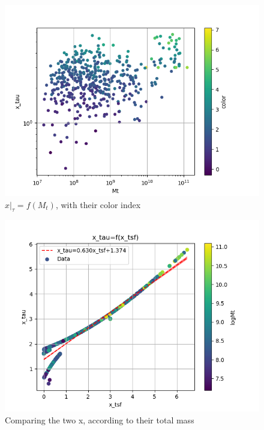 \documentclass[a4paper,twocolumn]{article}
\begin{document}
\begin{figure}[!htpb]
\centering
\includegraphics[width=.9\linewidth]{./figs/x_tau-Mt-color.png}
\caption{\label{fig:$x|_\tau=f(M_t)$, with their color index}\(x|_\tau=f(M_t)\), with their color index}
\end{figure}

\begin{figure}[!htpb]
\centering
\includegraphics[width=.9\linewidth]{./figs/x_tsf-x_tau-color_logMt.png}
\caption{\label{fig:Comparing the two x, according to their total mass}Comparing the two x, according to their total mass}
\end{figure}
\end{document}
